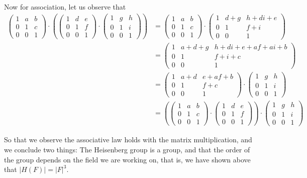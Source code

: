 \documentclass[notitlepage]{report}
\newcommand{\lrp}[1]{\left( #1 \right)}
\newcommand{\abs}[1]{\left| #1 \right|}
\begin{document}
\begin{mdframed}[]
	 Now for association, let us observe that
	 \begin{align*}
	  \begin{pmatrix}
		 1&a&b  \\ 
		 0&1&c\\    
		 0&0&1
	  \end{pmatrix} \cdot \lrp{
	   \begin{pmatrix}
	   1&d&e  \\ 
	   0&1&f \\    
	   0&0&1
	   \end{pmatrix} \cdot
	    \begin{pmatrix}
	    1&g&h  \\ 
	    0&1&i \\    
	    0&0&1
	    \end{pmatrix}} &= 
	\begin{pmatrix}
	 1&a&b  \\ 
	 0&1&c\\    
	 0&0&1
	\end{pmatrix} \cdot
	\begin{pmatrix}
	1&d+g&h+di+e  \\ 
	0&1&f+i\\    
	0&0&1
	\end{pmatrix} \\
	&= 
	\begin{pmatrix}
	1&a+d+g&h+di+e+af+ai+b  \\ 
	0&1&f+i+c\\    
	0&0&1
	\end{pmatrix} \\
	&= 
	\begin{pmatrix}
	1&a+d&e+af+b  \\ 
	0&1&f+c\\    
	0&0&1
	\end{pmatrix} \cdot
	\begin{pmatrix}
	1&g&h  \\ 
	0&1&i\\    
	0&0&1
	\end{pmatrix} \\
	&= \lrp{ \begin{pmatrix}
	 1&a&b  \\ 
	 0&1&c\\    
	 0&0&1
	 \end{pmatrix} \cdot 
	 	\begin{pmatrix}
	 	1&d&e  \\ 
	 	0&1&f \\    
	 	0&0&1
	 	\end{pmatrix} } \cdot
	 	\begin{pmatrix}
	 	1&g&h  \\ 
	 	0&1&i \\    
	 	0&0&1
	 	\end{pmatrix} 
	 \end{align*}
	 
So that we observe the associative law holds with the matrix multiplication, and we conclude two things: The Heisenberg group is a group, and that the order of the group depends on the field we are working on, that is, we have shown above that $ \abs{H(F)} = \abs{F}^3 $.
\end{mdframed}
\end{document}
